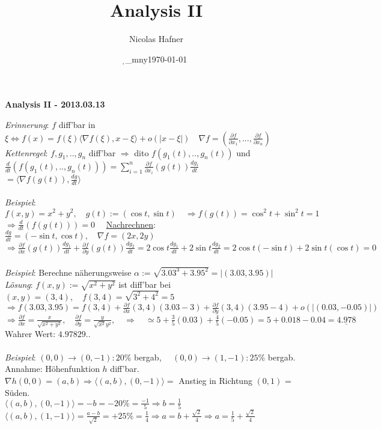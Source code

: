 \documentclass[12pt,a4paper,titlepage]{article}
\author{Nicolas Hafner}
\title{Analysis II}
\date{\d_mny\today}
\renewcommand{\d}{\partial}
\begin{document}
	
\begin{center}{\bfseries\Huge Analysis II - 2013.03.13}\end{center}
\textit{Erinnerung}: $f$ diff'bar in $\xi \iff f(x)=f(\xi)\langle\nabla f(\xi),x-\xi\rangle+o(|x-\xi|) \quad \nabla f=(\frac{\d f}{\d x_1},...,\frac{\d f}{\d x_n})$ \\
\textit{Kettenregel}: $f,g_1,..,g_n$ diff'bar $\Rightarrow$ dito $f(g_1(t),..,g_n(t))$ und $\frac{d}{dt}(f(g_1(t),..,g_n(t)))=\sum_{i=1}^n\frac{\d f}{\d x_i}(g(t))\frac{dg_i}{dt}$ \\
$=\langle\nabla f(g(t)), \frac{dg}{dt}\rangle$ \\
\\
\textit{Beispiel}: $f(x,y)=x^2+y^2, \quad g(t):=(\cos t,\sin t) \quad\Rightarrow f(g(t))=\cos^2t+\sin^2t=1$ \\
$\Rightarrow \frac{d}{dt}(f(g(t)))=0 \quad$ \underline{Nachrechnen}: $\frac{dg}{dt}=(-\sin t,\cos t),\quad \nabla f=(2x,2y) $ \\
$\Rightarrow \frac{\d f}{\d x}(g(t))\frac{dg_1}{dt}+\frac{\d f}{\d y}(g(t))\frac{dg_2}{dt} = 2\cos t\frac{dg_1}{dt}+2\sin t\frac{dg_2}{dt} = 2\cos t(-\sin t)+2\sin t(\cos t) = 0$ \\
\\
\textit{Beispiel}: Berechne näherungsweise $\alpha:=\sqrt{3.03^3+3.95^2}=|(3.03,3.95)|$ \\
\textit{Lösung}: $f(x,y):=\sqrt{x^2+y^2}$ ist diff'bar bei $(x,y)=(3,4),\quad f(3,4)=\sqrt{3^2+4^2}=5$ \\
$\Rightarrow f(3.03,3.95) = f(3,4)+\frac{\d f}{\d x}(3,4)(3.03-3) + \frac{\d f}{\d y}(3,4)(3.95-4)+o(|(0.03,-0.05)|)$ \\
$\Rightarrow \frac{\d f}{\d x}=\frac{x}{\sqrt{x^2+y^2}},\quad \frac{\d f}{\d y}=\frac{y}{\sqrt{x^2}{y^2}}, \quad\Rightarrow\quad \simeq 5+\frac{3}{5}(0.03)+\frac{4}{5}(-0.05)=5+0.018-0.04=\underline{4.978}$ \\
Wahrer Wert: $4.97829..$ \\
\\
\textit{Beispiel}: $(0,0)\to(0,-1): 20\%$ bergab, $\quad (0,0)\to(1,-1): 25\%$ bergab. \\
Annahme: Höhenfunktion $h$ diff'bar. \\
$\nabla h(0,0)=(a,b) \Rightarrow \langle(a,b),(0,-1)\rangle=$ Anstieg in Richtung $(0,1)$ = Süden. \\
$\langle(a,b),(0,-1)\rangle=-b=-20\%=\frac{-1}{5} \Rightarrow b=\frac{1}{5}$ \\
$\langle(a,b),(1,-1)\rangle=\frac{a-b}{\sqrt{2}}=+25\%=\frac{1}{4} \Rightarrow a=b+\frac{\sqrt{2}}{4} \Rightarrow a=\frac{1}{5}+\frac{\sqrt{2}}{4}$ \\
\end{document}
